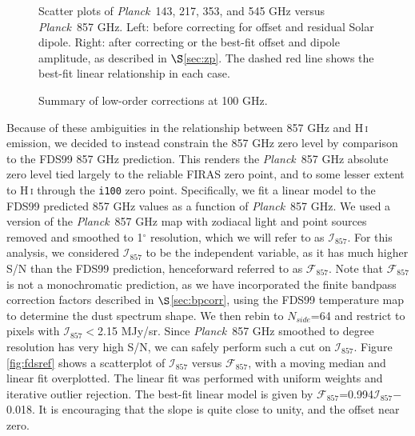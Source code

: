 \documentclass{emulateapj}
\newcommand{\PLANCK}{{\it Planck}}
\begin{document}
\begin{figure}
\begin{center}
\caption{\label{fig:dip}  Scatter plots of \PLANCK~143, 217, 353, and 545 GHz 
versus \PLANCK~857 GHz. Left: before correcting for offset and residual Solar 
dipole. Right: after correcting or the best-fit offset and dipole amplitude, as
described in $\S$\ref{sec:zp}. The dashed red line shows the best-fit linear 
relationship in each case.}
\end{center}
\end{figure}

\begin{figure*}
\begin{center}
\caption{\label{fig:quad} Summary of low-order corrections at 100 GHz.}
\end{center}
\end{figure*}

Because of these ambiguities in the relationship between 857 GHz and 
H\,\textsc{i} emission, we decided to instead constrain the 857 GHz zero level
by comparison to the FDS99 857 GHz prediction. This renders the \PLANCK~857 GHz
absolute zero level tied largely to the reliable FIRAS zero point, and to some 
lesser extent to H\,\textsc{i} through the \verb|i100| zero point. 
Specifically, we fit a linear model to the FDS99 predicted 857 GHz values as a 
function of \PLANCK~857 GHz. We used a version of the \PLANCK~857 GHz map with 
zodiacal light and point sources removed and smoothed to 1$^{\circ}$ 
resolution, which we will refer to as $\mathcal{I}_{857}$. For this analysis, 
we considered $\mathcal{I}_{857}$ to be the independent variable, as it has 
much higher S/N than the FDS99 prediction, henceforward referred to as 
$\mathcal{F}_{857}$. Note that $\mathcal{F}_{857}$ is not a monochromatic 
prediction, as we have incorporated the finite bandpass correction factors 
described in $\S$\ref{sec:bpcorr}, using the FDS99 temperature map to determine
the dust spectrum shape. We then rebin to $N_{side}$=64 and restrict to pixels 
with $\mathcal{I}_{857}$$<$2.15 MJy/sr. Since \PLANCK~857 GHz smoothed to 
degree resolution has very high S/N, we can safely perform such a cut on 
$\mathcal{I}_{857}$. Figure \ref{fig:fdsref} shows a scatterplot of 
$\mathcal{I}_{857}$ versus $\mathcal{F}_{857}$, with a moving median and linear
fit overplotted. The linear fit was performed with uniform weights and 
iterative outlier rejection. The best-fit linear model is given by 
$\mathcal{F}_{857}$=0.994$\mathcal{I}_{857}$$-$0.018. It is encouraging that 
the slope is quite close to unity, and the offset near zero.
\end{document}
